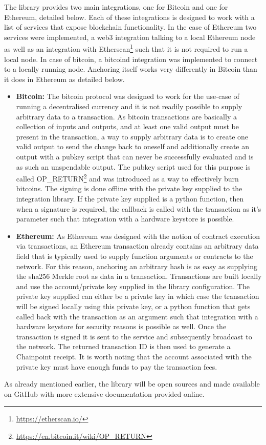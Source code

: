\documentclass[12pt,msc,a4paper,oneside]{ucl_thesis}
\begin{document}
The library provides two main integrations, one for Bitcoin and one for Ethereum, detailed below. Each of these integrations is designed to work with a list of services that expose blockchain functionality. In the case of Ethereum two services were implemented, a web3 integration talking to a local Ethereum node as well as an integration with Etherscan\footnote{\url{https://etherscan.io/}} such that it is not required to run a local node. In case of bitcoin, a bitcoind integration was implemented to connect to a locally running node. Anchoring itself works very differently in Bitcoin than it does in Ethereum as detailed below.
\begin{itemize}
    \item \textbf{Bitcoin:} The bitcoin protocol was designed to work for the use-case of running a decentralised currency and it is not readily possible to supply arbitrary data to a transaction. As bitcoin transactions are basically a collection of inputs and outputs, and at least one valid output must be present in the transaction, a way to supply arbitrary data is to create one valid output to send the change back to oneself and additionally create an output with a pubkey script that can never be successfully evaluated and is as such an unspendable output. The pubkey script used for this purpose is called OP\_RETURN\footnote{\url{https://en.bitcoin.it/wiki/OP_RETURN}} and was introduced as a way to effectively burn bitcoins. The signing is done offline with the private key supplied to the integration library. If the private key supplied is a python function, then when a signature is required, the callback is called with the transaction as it's parameter such that integration with a hardware keystore is possible.

    \item \textbf{Ethereum:} As Ethereum was designed with the notion of contract execution via transactions, an Ethereum transaction already contains an arbitrary data field that is typically used to supply function arguments or contracts to the network. For this reason, anchoring an arbitrary hash is as easy as supplying the sha256 Merkle root as data in a transaction. Transactions are built locally and use the account/private key supplied in the library configuration. The private key supplied can either be a private key in which case the transaction will be signed locally using this private key, or a python function that gets called back with the transaction as an argument such that integration with a hardware keystore for security reasons is possible as well. Once the transaction is signed it is sent to the service and subsequently broadcast to the network. The returned transaction ID is then used to generate a Chainpoint receipt. It is worth noting that the account associated with the private key must have enough funds to pay the transaction fees.
\end{itemize}
As already mentioned earlier, the library will be open sources and made available on GitHub with more extensive documentation provided online.
\end{document}
